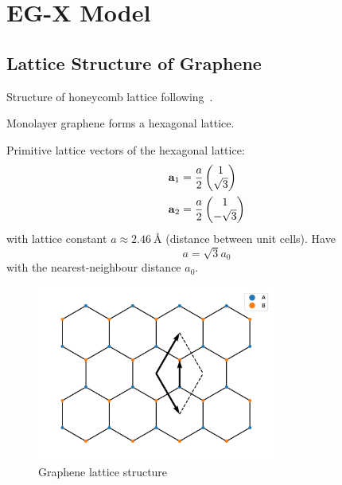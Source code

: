 \documentclass[../main.tex]{subfiles}
\begin{document}
\chapter{EG-X Model}\label{ch:eg-x-model}

\section{Lattice Structure of Graphene}\label{sec:lattice-structure-of-graphene}

Structure of honeycomb lattice following~\cite{Yang_Li_Lee_Ng_2018}.

Monolayer graphene forms a hexagonal lattice.

Primitive lattice vectors of the hexagonal lattice:
\begin{align}
    \bm{\mathrm{a}}_1 &= \frac{a}{2} \begin{pmatrix} 1 \\ \sqrt{3} \end{pmatrix} \\
    \bm{\mathrm{a}}_2 &= \frac{a}{2} \begin{pmatrix} 1 \\ -\sqrt{3} \end{pmatrix}
\end{align}
with lattice constant \(a \approx \SI{2.46}{\angstrom}\) (distance between unit cells).
Have
\begin{equation}
    a = \sqrt{3} a_0
\end{equation}
with the nearest-neighbour distance \(a_0\).

\begin{figure}[htb]
    \centering
    \includegraphics[width=0.7\textwidth]{images/graphene lattice}
    \caption{Graphene lattice structure}
    \label{fig:graphene lattice structure}
\end{figure}
\end{document}

